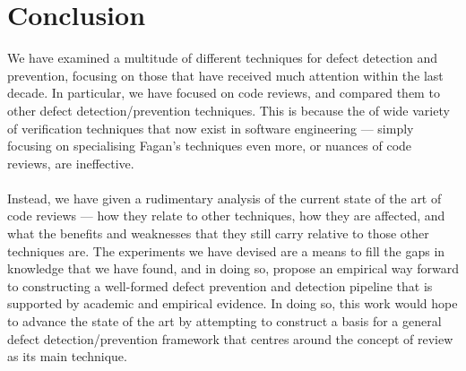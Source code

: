 \chapter{Conclusion}

We have examined a multitude of different techniques for defect detection and prevention, focusing
on those that have received much attention within the last decade.
In particular, we have focused on code reviews, and compared them to other defect
detection/prevention techniques.
This is because the of wide variety of verification techniques that now exist in software
engineering --- simply focusing on specialising Fagan's techniques even more, or nuances of code
reviews, are ineffective.\\
\\
Instead, we have given a rudimentary analysis of the current state of the art of code reviews ---
how they relate to other techniques, how they are affected, and what the benefits and weaknesses
that they still carry relative to those other techniques are.
The experiments we have devised are a means to fill the gaps in knowledge that we have found, and in
doing so, propose an empirical way forward to constructing a well-formed defect prevention and
detection pipeline that is supported by academic and empirical evidence.
In doing so, this work would hope to advance the state of the art by attempting to construct a
basis for a general defect detection/prevention framework that centres around the concept of review
as its main technique.

